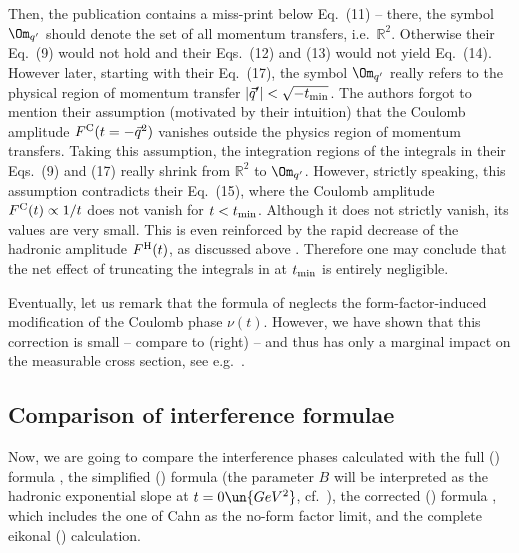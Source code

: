 Then, the publication  contains a miss-print below Eq.~(11) -- there, the symbol $\Om_{q'}$ should denote the set of all momentum transfers, i.e.~$\mathbb{R}^2$. Otherwise their Eq.~(9) would not hold and their Eqs.~(12) and (13) would not yield Eq.~(14). However later, starting with their Eq.~(17), the symbol $\Om_{q'}$ really refers to the physical region of momentum transfer $|\vec q'| < \sqrt{-t_{\rm min}}$. The authors forgot to mention their assumption (motivated by their intuition) that the Coulomb amplitude $F^{\rm C}(t = -\vec q^2)$ vanishes outside the physics region of momentum transfers. Taking this assumption, the integration regions of the integrals in their Eqs.~(9) and (17) really shrink from $\mathbb R^2$ to $\Om_{q'}$. However, strictly speaking, this assumption contradicts their Eq.~(15), where the Coulomb amplitude $F^{\rm C}(t) \propto 1/t$ does not vanish for $t < t_{\rm min}$. Although it does not strictly vanish, its values are very small. This is even reinforced by the rapid decrease of the hadronic amplitude $F^{\rm H}(t)$, as discussed above . Therefore one may conclude that the net effect of truncating the integrals in  at $t_{\rm min}$ is entirely negligible.

Eventually, let us remark that the formula of \KaL{} neglects the form-factor-induced modification of the Coulomb phase $\nu(t)$. However, we have shown that this correction is small -- compare  to  (right) -- and thus has only a marginal impact on the measurable cross section, see e.g.~.


\subsection[int cmp]{Comparison of interference formulae}

Now, we are going to compare the interference phases calculated with
{
\> the full \WY{} () formula ,
\> the simplified \WY{} () formula  (the parameter $B$ will be interpreted as the hadronic exponential slope at $t=0\un{GeV^2}$, cf.~),
\> the corrected \KL{} () formula , which includes the one of Cahn as the no-form factor limit, and
\> the complete eikonal () calculation.
}

